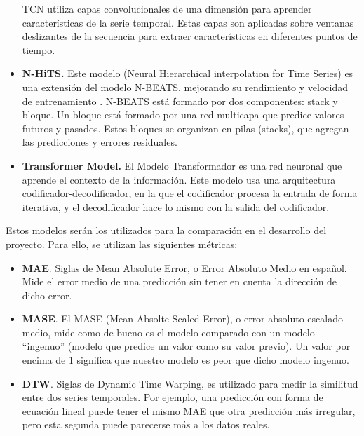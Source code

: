 \begin{itemize}
        TCN utiliza capas convolucionales de una dimensión para aprender características de la serie temporal. Estas 
        capas son aplicadas sobre ventanas deslizantes de la secuencia para extraer características en diferentes puntos 
        de tiempo.
    \item \textbf{N-HiTS.} Este modelo (Neural Hierarchical interpolation for Time Series) es una extensión del modelo 
        N-BEATS, mejorando su rendimiento y velocidad de entrenamiento \cite{DBLP:journals/corr/abs-2201-12886}. N-BEATS \cite{Oreshkin2020N-BEATS:}
        está formado por dos componentes: stack y bloque. Un bloque está formado por una red multicapa que predice 
        valores futuros y pasados. Estos bloques se organizan en pilas (stacks), que agregan las predicciones y errores 
        residuales. 
    \item \textbf{Transformer Model.} El Modelo Transformador \cite{DBLP:journals/corr/VaswaniSPUJGKP17} es una red 
        neuronal que aprende el contexto de la información. Este modelo usa una arquitectura codificador-decodificador,
        en la que el codificador procesa la entrada de forma iterativa, y el decodificador hace lo mismo con la salida del 
        codificador.
    \end{itemize}

Estos modelos serán los utilizados para la comparación en el desarrollo del proyecto. Para ello, se utilizan 
las siguientes métricas:
\begin{itemize}
    \item \textbf{MAE}. Siglas de Mean Absolute Error, o Error Absoluto Medio en español. Mide el error medio
        de una predicción sin tener en cuenta la dirección de dicho error.
    \item \textbf{MASE}. El MASE \cite{ibm:docs/metrics} (Mean Absolte Scaled Error), o error absoluto escalado medio, mide como de bueno es 
        el modelo comparado con un modelo ``ingenuo'' (modelo que predice un valor como su valor previo). Un valor 
        por encima de 1 significa que nuestro modelo es peor que dicho modelo ingenuo.
    \item \textbf{DTW}. Siglas de Dynamic Time Warping, es utilizado para medir la similitud entre dos series temporales. Por ejemplo, una predicción 
        con forma de ecuación lineal puede tener el mismo MAE que otra predicción más irregular, pero esta segunda 
        puede parecerse más a los datos reales.
\end{itemize}